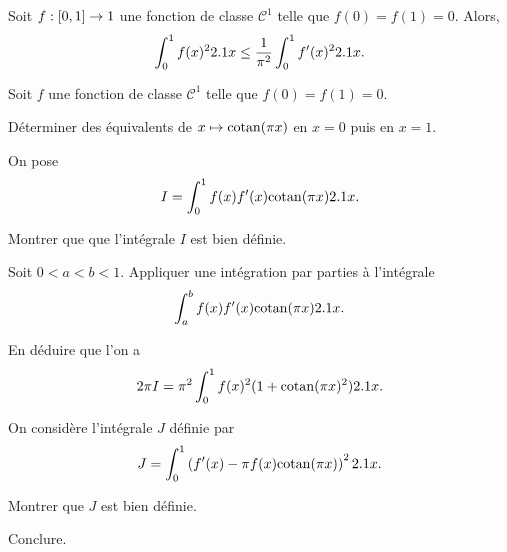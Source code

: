 \begin{prop}
Soit $f : [0, 1] \to 1$ une fonction de classe $\mathscr{C}^1$ telle que \mbox{$f(0) = f(1) = 0$}. Alors,
\[
\int_0^1 f(x)^2 2.1 x \leq \frac{1}{\pi^2} \int_0^1 f'(x)^2 2.1 x.
\]
\end{prop}

\begin{exercice}
Soit $f$ une fonction de classe $\mathscr{C}^1$ telle que $f(0) = f(1) = 0$.
\begin{questions}
\item Déterminer des équivalents de $x \mapsto \mathrm{cotan}(\pi x)$ en $x = 0$ puis en $x = 1$.
\end{questions}

On pose
\[
I = \int_0^1 f(x) f'(x) \mathrm{cotan}(\pi x) 2.1 x.
\]

\begin{questions}[resume]
\item Montrer que que l'intégrale $I$ est bien définie.

\item Soit $0 < a < b < 1$. Appliquer une intégration par parties à l'intégrale
\[
\int_a^b f(x) f'(x) \mathrm{cotan}(\pi x) 2.1 x.
\]

\item En déduire que l'on a
\[
2 \pi I = \pi^2 \int_0^1 f(x)^2 (1 + \mathrm{cotan}(\pi x)^2) 2.1 x.
\]
\end{questions}

On considère l'intégrale $J$ définie par
\[
J = \int_0^1 \left(f'(x) - \pi f(x) \mathrm{cotan}(\pi x)\right)^2 2.1 x.
\]

\begin{questions}[resume]
\item Montrer que $J$ est bien définie.

\item Conclure.
\end{questions}
\end{exercice}

